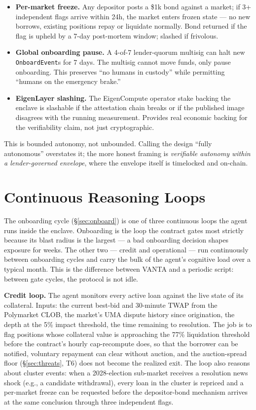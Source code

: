 \documentclass[11pt,letterpaper]{article}
\begin{document}
\begin{itemize}[leftmargin=*,itemsep=2pt,topsep=2pt]
  \item \textbf{Per-market freeze.} Any depositor posts a \$1k bond against a market; if 3+ independent flags arrive within 24h, the market enters frozen state --- no new borrows, existing positions repay or liquidate normally. Bond returned if the flag is upheld by a 7-day post-mortem window; slashed if frivolous.
  \item \textbf{Global onboarding pause.} A 4-of-7 lender-quorum multisig can halt new \texttt{OnboardEvent}s for 7 days. The multisig cannot move funds, only pause onboarding. This preserves ``no humans in custody'' while permitting ``humans on the emergency brake.''
  \item \textbf{EigenLayer slashing.} The EigenCompute operator stake backing the enclave is slashable if the attestation chain breaks or if the published image disagrees with the running measurement. Provides real economic backing for the verifiability claim, not just cryptographic.
\end{itemize}

This is bounded autonomy, not unbounded. Calling the design ``fully autonomous'' overstates it; the more honest framing is \emph{verifiable autonomy within a lender-governed envelope}, where the envelope itself is timelocked and on-chain.

\section{Continuous Reasoning Loops}
\label{sec:loops}

The onboarding cycle (\S\ref{sec:onboard}) is one of three continuous loops the agent runs inside the enclave. Onboarding is the loop the contract gates most strictly because its blast radius is the largest --- a bad onboarding decision shapes exposure for weeks. The other two --- credit and operational --- run continuously between onboarding cycles and carry the bulk of the agent's cognitive load over a typical month. This is the difference between VANTA and a periodic script: between gate cycles, the protocol is not idle.

\textbf{Credit loop.} The agent monitors every active loan against the live state of its collateral. Inputs: the current best-bid and 30-minute TWAP from the Polymarket CLOB, the market's UMA dispute history since origination, the depth at the 5\% impact threshold, the time remaining to resolution. The job is to flag positions whose collateral value is approaching the 77\% liquidation threshold before the contract's hourly cap-recompute does, so that the borrower can be notified, voluntary repayment can clear without auction, and the auction-spread floor (\S\ref{sec:threats}, T6) does not become the realized exit. The loop also reasons about cluster events: when a 2028-election sub-market receives a resolution news shock (e.g., a candidate withdrawal), every loan in the cluster is repriced and a per-market freeze can be requested before the depositor-bond mechanism arrives at the same conclusion through three independent flags.
\end{document}
